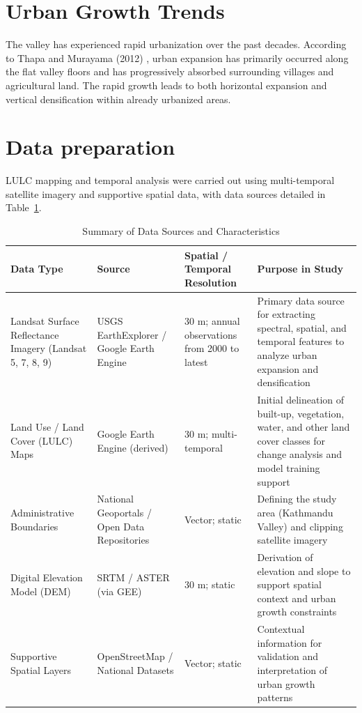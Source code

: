 \documentclass[main]{subfiles}
\begin{document}
\section{Urban Growth Trends}
The valley has experienced rapid urbanization over the past decades. According to Thapa and Murayama (2012) \cite{thapa2012scenario}, urban expansion has primarily occurred along the flat valley floors and has progressively absorbed surrounding villages and agricultural land. The rapid growth leads to both horizontal expansion and vertical densification within already urbanized areas.


\section{Data preparation}
LULC mapping and temporal analysis were carried out using multi-temporal satellite imagery and supportive spatial data, with data sources detailed in Table~\ref{tab:data_sources}.

\begin{table}[h]
\centering
\caption{Summary of Data Sources and Characteristics}
\label{tab:data_sources}
\begin{tabular}{|p{3.2cm}|p{4.2cm}|p{3cm}|p{3.5cm}|}
\hline
\textbf{Data Type} & \textbf{Source} & \textbf{Spatial / Temporal Resolution} & \textbf{Purpose in Study} \\
\hline
Landsat Surface Reflectance Imagery (Landsat 5, 7, 8, 9) & USGS EarthExplorer / Google Earth Engine & 30 m; annual observations from 2000 to latest & Primary data source for extracting spectral, spatial, and temporal features to analyze urban expansion and densification \\
\hline
Land Use / Land Cover (LULC) Maps & Google Earth Engine (derived) & 30 m; multi-temporal & Initial delineation of built-up, vegetation, water, and other land cover classes for change analysis and model training support \\
\hline
Administrative Boundaries & National Geoportals / Open Data Repositories & Vector; static & Defining the study area (Kathmandu Valley) and clipping satellite imagery \\
\hline
Digital Elevation Model (DEM) & SRTM / ASTER (via GEE) & 30 m; static & Derivation of elevation and slope to support spatial context and urban growth constraints \\
\hline
Supportive Spatial Layers & OpenStreetMap / National Datasets & Vector; static & Contextual information for validation and interpretation of urban growth patterns \\
\hline
\end{tabular}
\end{table}
\end{document}
